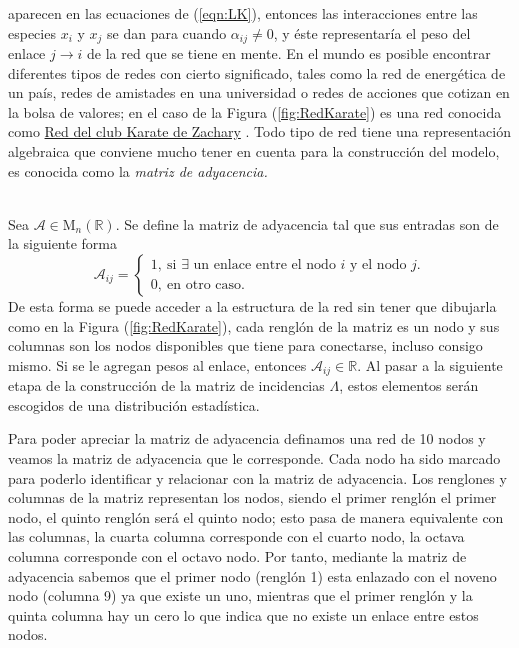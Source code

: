 aparecen en las ecuaciones de (\ref{eqn:LK}), entonces las interacciones entre las especies $x_i$ y $x_j$ se dan para cuando $\alpha_{ij}\neq 0$, y éste representaría el peso del enlace $j\to i$ de la red que se tiene en mente. En el mundo es posible encontrar diferentes tipos de redes con cierto significado, tales como la red de energética de un país, redes de amistades en una universidad o redes de acciones que cotizan en la bolsa de valores; en el caso de la Figura (\ref{fig:RedKarate}) es una red conocida como \href{https://en.wikipedia.org/wiki/Zachary%27s_karate_club}{Red del club Karate de Zachary} \cite{newman2018networks}. Todo tipo de red tiene una representación algebraica que conviene mucho tener en cuenta para la construcción del modelo, es conocida como la \textit{matriz de adyacencia.}\\
\\
\begin{definición}\label{def:matrizdeadyacencia}
	Sea $\mathcal{A}\in\mathrm{M}_n(\mathbb{R}) $. Se define la matriz de adyacencia tal que sus entradas son de la siguiente forma
	$$\mathcal{A}_{ij}= 
	\begin{cases}
		1, \ \text{si $\exists$ un enlace entre el nodo $i$ y el nodo $j$.}\\
		0, \ \text{en otro caso}.
	\end{cases}$$
	De esta forma se puede acceder a la estructura de la red sin tener que dibujarla como en la Figura (\ref{fig:RedKarate}), cada renglón de la matriz es un nodo y sus columnas son los nodos disponibles que tiene para conectarse, incluso consigo mismo. Si se le agregan pesos al enlace, entonces $\mathcal{A}_{ij}\in\mathbb{R}$. Al pasar a la siguiente etapa de la construcción de la matriz de incidencias $\Lambda$, estos elementos serán escogidos de una distribución estadística. 
\end{definición}
\begin{ejemplo}
	Para poder apreciar la matriz de adyacencia definamos una red de 10 nodos y veamos la matriz de adyacencia que le corresponde. Cada nodo ha sido marcado para poderlo identificar y relacionar con la matriz de adyacencia. Los renglones y columnas de la matriz representan los nodos, siendo el primer renglón el primer nodo, el quinto renglón será el quinto nodo; esto pasa de manera equivalente con las columnas, la cuarta columna corresponde con el cuarto nodo, la octava columna corresponde con el octavo nodo. Por tanto, mediante la matriz de adyacencia sabemos que el primer nodo (renglón 1) esta enlazado con el noveno nodo (columna 9) ya que existe un uno, mientras que el primer renglón y la quinta columna hay un cero lo que indica que no existe un enlace entre estos nodos. 
\end{ejemplo}
